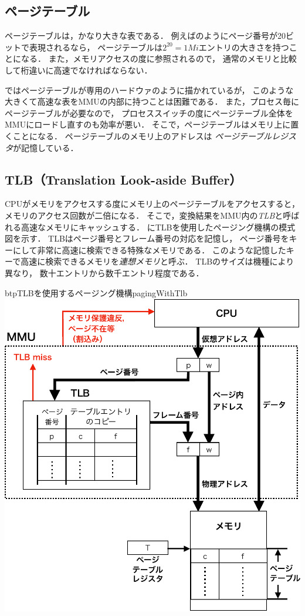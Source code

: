 \subsection{ページテーブル}
ページテーブルは，かなり大きな表である．
例えばのようにページ番号が20ビットで表現されるなら，
ページテーブルは$2^{20}=1Mi$エントリの大きさを持つことになる．
また，メモリアクセスの度に参照されるので，
通常のメモリと比較して桁違いに高速でなければならない．

ではページテーブルが専用のハードウァのように描かれているが，
このような大きくて高速な表をMMUの内部に持つことは困難である．
また，プロセス毎にページテーブルが必要なので，
プロセススイッチの度にページテーブル全体をMMUにロードし直すのも効率が悪い．
そこで，ページテーブルはメモリ上に置くことになる．
ページテーブルのメモリ上のアドレスは
\emph{ページテーブルレジスタ}が記憶している．

\subsection{TLB（Translation Look-aside Buffer）}
CPUがメモリをアクセスする度にメモリ上のページテーブルをアクセスすると，
メモリのアクセス回数が二倍になる．
そこで，変換結果をMMU内の\emph{TLB}と呼ばれる高速なメモリにキャッシュする．
にTLBを使用したページング機構の模式図を示す．
TLBはページ番号とフレーム番号の対応を記憶し，
ページ番号をキーにして非常に高速に検索できる特殊なメモリである．
このような記憶したキーで高速に検索できるメモリを\emph{連想メモリ}と呼ぶ．
TLBのサイズは機種により異なり，
数十エントリから数千エントリ程度である．

\begin{myfig}{btp}{TLBを使用するページング機構}{pagingWithTlb}
  \includegraphics[scale=0.66]{Fig/pagingWithTlb-crop.pdf}
\end{myfig}

